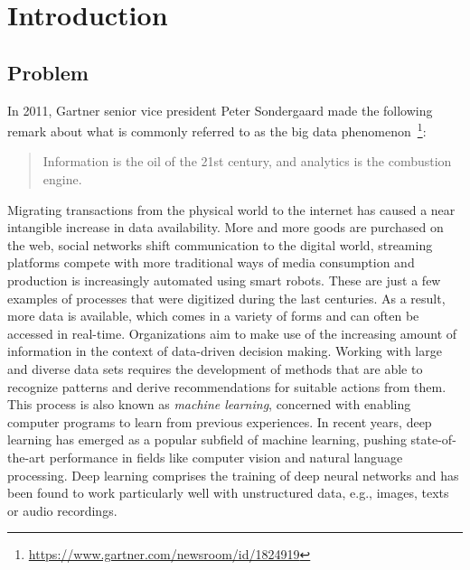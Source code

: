\section{Introduction}

\subsection{Problem}
\label{sec:problem}

In 2011, Gartner senior vice president Peter Sondergaard made the following remark
about what is commonly referred to as the big data phenomenon~\footnote{\url{https://www.gartner.com/newsroom/id/1824919}}:

\begin{quote}
  Information is the oil of the 21st century, and analytics is the combustion engine.
\end{quote}

Migrating transactions from the physical world to the internet has caused a near
intangible increase in data availability.
More and more goods are purchased on the web, social networks shift communication
to the digital world, streaming platforms compete with more traditional ways
of media consumption and production is increasingly automated using smart robots.
These are just a few examples of processes that were digitized during the last
centuries.
As a result, more data is available, which comes in a variety of forms and
can often be accessed in real-time.
Organizations aim to make use of the increasing amount of information in the
context of data-driven decision making.
Working with large and diverse data sets requires the development of methods
that are able to recognize patterns and derive recommendations for suitable
actions from them.
This process is also known as \textit{machine learning}, concerned with
enabling computer programs to learn from previous experiences.
In recent years, deep learning has emerged as a popular subfield of machine
learning, pushing state-of-the-art performance in fields like computer vision and
natural language processing.
Deep learning comprises the training of deep neural networks and has been found 
to work particularly well with unstructured data, e.g., images, texts or audio 
recordings.


